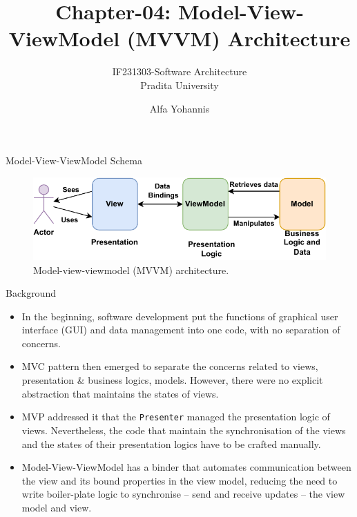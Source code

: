 \documentclass{beamer}
\title{Chapter-04: Model-View-ViewModel (MVVM) Architecture}
\subtitle{IF231303-Software Architecture\\Pradita University}
\author{Alfa Yohannis}
\begin{document}
\begin{frame}[plain]
    \maketitle
\end{frame}

\begin{frame}{Model-View-ViewModel Schema}
\begin{figure}[h]
    \centering
    \includegraphics[width=\textwidth]{mvvm}
    \caption{Model-view-viewmodel (MVVM) architecture.}
    \label{fig:mvvm}
\end{figure}
\end{frame}

\begin{frame}{Background}
\begin{itemize}
\item In the beginning, software development put the functions of graphical user interface (GUI) and data management into one code, with no separation of concerns.
\item MVC pattern then emerged to separate the concerns related to views, presentation \& business logics, models. However, there were no explicit abstraction that maintains the states of views.  
\item MVP addressed it that the \texttt{Presenter} managed the presentation logic of views.
Nevertheless, the code that maintain the synchronisation of the views and the states of their presentation logics have to be crafted manually.
\item Model-View-ViewModel has a binder that automates communication between the view and its bound properties in the view model, reducing the need to write boiler-plate logic to synchronise -- send and receive updates -- the view model and view.
\end{itemize}
\end{frame}
\end{document}
